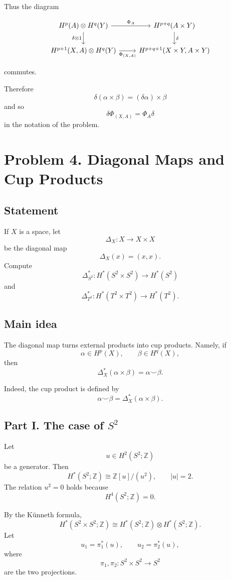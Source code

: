 \documentclass[12pt,a4paper]{article}
\theoremstyle{notespace}
\begin{document}
Thus the diagram

\[
\begin{tikzcd}
	H^p(A)\otimes H^q(Y)
	\arrow[r,"\Phi_A"]
	\arrow[d,"\delta\otimes 1"']
	&
	H^{p+q}(A\times Y)
	\arrow[d,"\delta"]
	\\
	H^{p+1}(X,A)\otimes H^q(Y)
	\arrow[r,"\Phi_{(X,A)}"']
	&
	H^{p+q+1}(X\times Y,A\times Y)
\end{tikzcd}
\]

commutes.

Therefore
\[
\boxed{
	\delta(\alpha\times\beta)
	=
	(\delta\alpha)\times\beta
}
\]
and so
\[
\boxed{
	\delta\Phi_{(X,A)}
	=
	\Phi_A\delta
}
\]
in the notation of the problem.

\section{Problem 4. Diagonal Maps and Cup Products}

\subsection*{Statement}

If \(X\) is a space, let
\[
\Delta_X:X\to X\times X
\]
be the diagonal map
\[
\Delta_X(x)=(x,x).
\]
Compute
\[
\Delta_{S^2}^*:H^*(S^2\times S^2)\to H^*(S^2)
\]
and
\[
\Delta_{T^2}^*:H^*(T^2\times T^2)\to H^*(T^2).
\]

\subsection*{Main idea}

The diagonal map turns external products into cup products. Namely, if
\[
\alpha\in H^p(X),
\qquad
\beta\in H^q(X),
\]
then
\[
\Delta_X^*(\alpha\times \beta)
=
\alpha\smile \beta.
\]

Indeed, the cup product is defined by
\[
\alpha\smile \beta
=
\Delta_X^*(\alpha\times \beta).
\]

\subsection*{Part I. The case of \(S^2\)}

Let
\[
u\in H^2(S^2;\mathbb Z)
\]
be a generator. Then
\[
H^*(S^2;\mathbb Z)
\cong
\mathbb Z[u]/(u^2),
\qquad
|u|=2.
\]
The relation \(u^2=0\) holds because
\[
H^4(S^2;\mathbb Z)=0.
\]

By the Künneth formula,
\[
H^*(S^2\times S^2;\mathbb Z)
\cong
H^*(S^2;\mathbb Z)\otimes H^*(S^2;\mathbb Z).
\]
Let
\[
u_1=\pi_1^*(u),
\qquad
u_2=\pi_2^*(u),
\]
where
\[
\pi_1,\pi_2:S^2\times S^2\to S^2
\]
are the two projections.
\end{document}

